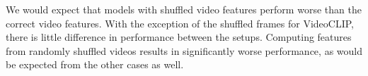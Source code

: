 We would expect that models with shuffled video features perform worse than the
correct video features. With the exception of the shuffled frames for
VideoCLIP, there is little difference in performance between the setups. Computing
features from randomly shuffled videos results in significantly worse performance,
as would be expected from the other cases as well. %

% 
% 
% 
% 
